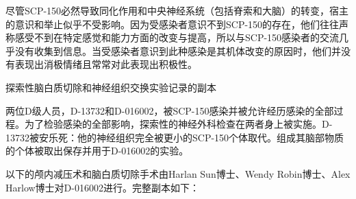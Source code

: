 尽管SCP-150必然导致同化作用和中央神经系统（包括脊索和大脑）的转变，宿主的意识和举止似乎不受影响。因为受感染者意识不到SCP-150的存在，他们往往声称感受不到在特定感觉和能力方面的改变与提高，所以与SCP-150感染者的交流几乎没有收集到信息。当受感染者意识到此种感染是其机体改变的原因时，他们并没有表现出消极情绪且常常对此表现出积极性。

探索性脑白质切除和神经组织交换实验记录的副本

两位D级人员，D-13732和D-016002，被SCP-150感染并被允许经历感染的全部过程。为了检验感染的全部影响，探索性的神经外科检查在两者身上被实施。D-13732被安乐死：他的神经组织完全被更小的SCP-150个体取代。组成其脑部物质的个体被取出保存并用于D-016002的实验。

以下的颅内减压术和脑白质切除手术由Harlan Sun博士、Wendy Robin博士、Alex Harlow博士对D-016002进行。完整副本如下：

